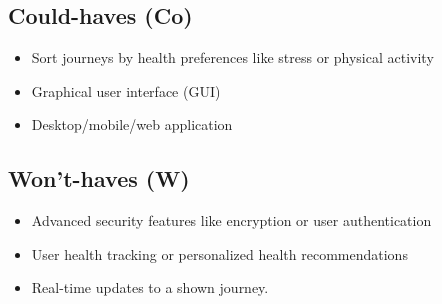 \subsection{Could-haves (Co)}\label{subsec:could-haves}

\begin{itemize}
    \item Sort journeys by health preferences like stress or physical activity
    \item Graphical user interface (GUI)
    \item Desktop/mobile/web application
\end{itemize}

\subsection{Won't-haves (W)}\label{subsec:wont-haves}

\begin{itemize}
    \item Advanced security features like encryption or user authentication
    \item User health tracking or personalized health recommendations
    \item Real-time updates to a shown journey.
\end{itemize}
